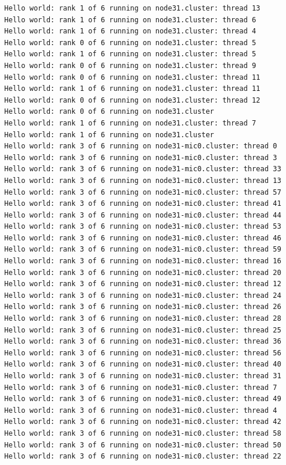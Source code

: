 \documentclass[pscyr,10pt]{hedlab}
\begin{document}
\begin{lstlisting}
  Hello world: rank 1 of 6 running on node31.cluster: thread 13
  Hello world: rank 1 of 6 running on node31.cluster: thread 6
  Hello world: rank 1 of 6 running on node31.cluster: thread 4
  Hello world: rank 0 of 6 running on node31.cluster: thread 5
  Hello world: rank 1 of 6 running on node31.cluster: thread 5
  Hello world: rank 0 of 6 running on node31.cluster: thread 9
  Hello world: rank 0 of 6 running on node31.cluster: thread 11
  Hello world: rank 1 of 6 running on node31.cluster: thread 11
  Hello world: rank 0 of 6 running on node31.cluster: thread 12
  Hello world: rank 0 of 6 running on node31.cluster
  Hello world: rank 1 of 6 running on node31.cluster: thread 7
  Hello world: rank 1 of 6 running on node31.cluster
  Hello world: rank 3 of 6 running on node31-mic0.cluster: thread 0
  Hello world: rank 3 of 6 running on node31-mic0.cluster: thread 3
  Hello world: rank 3 of 6 running on node31-mic0.cluster: thread 33
  Hello world: rank 3 of 6 running on node31-mic0.cluster: thread 13
  Hello world: rank 3 of 6 running on node31-mic0.cluster: thread 57
  Hello world: rank 3 of 6 running on node31-mic0.cluster: thread 41
  Hello world: rank 3 of 6 running on node31-mic0.cluster: thread 44
  Hello world: rank 3 of 6 running on node31-mic0.cluster: thread 53
  Hello world: rank 3 of 6 running on node31-mic0.cluster: thread 46
  Hello world: rank 3 of 6 running on node31-mic0.cluster: thread 59
  Hello world: rank 3 of 6 running on node31-mic0.cluster: thread 16
  Hello world: rank 3 of 6 running on node31-mic0.cluster: thread 20
  Hello world: rank 3 of 6 running on node31-mic0.cluster: thread 12
  Hello world: rank 3 of 6 running on node31-mic0.cluster: thread 24
  Hello world: rank 3 of 6 running on node31-mic0.cluster: thread 26
  Hello world: rank 3 of 6 running on node31-mic0.cluster: thread 28
  Hello world: rank 3 of 6 running on node31-mic0.cluster: thread 25
  Hello world: rank 3 of 6 running on node31-mic0.cluster: thread 36
  Hello world: rank 3 of 6 running on node31-mic0.cluster: thread 56
  Hello world: rank 3 of 6 running on node31-mic0.cluster: thread 40
  Hello world: rank 3 of 6 running on node31-mic0.cluster: thread 31
  Hello world: rank 3 of 6 running on node31-mic0.cluster: thread 7
  Hello world: rank 3 of 6 running on node31-mic0.cluster: thread 49
  Hello world: rank 3 of 6 running on node31-mic0.cluster: thread 4
  Hello world: rank 3 of 6 running on node31-mic0.cluster: thread 42
  Hello world: rank 3 of 6 running on node31-mic0.cluster: thread 58
  Hello world: rank 3 of 6 running on node31-mic0.cluster: thread 50
  Hello world: rank 3 of 6 running on node31-mic0.cluster: thread 22

\end{lstlisting}
\end{document}
